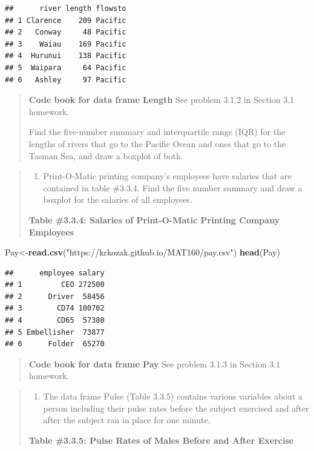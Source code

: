 \documentclass[]{book}
\newenvironment{Shaded}{\begin{snugshade}}{\end{snugshade}}
\newcommand{\KeywordTok}[1]{\textcolor[rgb]{0.13,0.29,0.53}{\textbf{#1}}}
\newcommand{\NormalTok}[1]{#1}
\newcommand{\StringTok}[1]{\textcolor[rgb]{0.31,0.60,0.02}{#1}}
\providecommand{\tightlist}{%
  \setlength{\itemsep}{0pt}\setlength{\parskip}{0pt}}
\begin{document}
\begin{verbatim}
##      river length flowsto
## 1 Clarence    209 Pacific
## 2   Conway     48 Pacific
## 3    Waiau    169 Pacific
## 4  Hurunui    138 Pacific
## 5  Waipara     64 Pacific
## 6   Ashley     97 Pacific
\end{verbatim}

\begin{quote}
\textbf{Code book for data frame Length} See problem 3.1.2 in Section 3.1 homework.

Find the five-number summary and interquartile range (IQR) for the lengths of rivers that go to the Pacific Ocean and ones that go to the Tasman Sea, and draw a boxplot of both.
\end{quote}

\begin{quote}
\begin{enumerate}
\def\labelenumi{\arabic{enumi}.}
\setcounter{enumi}{6}
\tightlist
\item
  Print-O-Matic printing company's employees have salaries that are contained in table \#3.3.4. Find the five number summary and draw a boxplot for the salaries of all employees.
\end{enumerate}

\textbf{Table \#3.3.4: Salaries of Print-O-Matic Printing Company Employees}
\end{quote}

\begin{Shaded}
\begin{Highlighting}[]
\NormalTok{Pay<-}\KeywordTok{read.csv}\NormalTok{(}\StringTok{"https://krkozak.github.io/MAT160/pay.csv"}\NormalTok{)}
\KeywordTok{head}\NormalTok{(Pay)}
\end{Highlighting}
\end{Shaded}

\begin{verbatim}
##      employee salary
## 1         CEO 272500
## 2      Driver  58456
## 3        CD74 100702
## 4        CD65  57380
## 5 Embellisher  73877
## 6      Folder  65270
\end{verbatim}

\begin{quote}
\textbf{Code book for data frame Pay} See problem 3.1.3 in Section 3.1 homework.
\end{quote}

\begin{quote}
\begin{enumerate}
\def\labelenumi{\arabic{enumi}.}
\setcounter{enumi}{7}
\tightlist
\item
  The data frame Pulse (Table 3.3.5) contains various variables about a person including their pulse rates before the subject exercised and after after the subject ran in place for one minute.
\end{enumerate}

\textbf{Table \#3.3.5: Pulse Rates of Males Before and After Exercise}
\end{quote}
\end{document}
